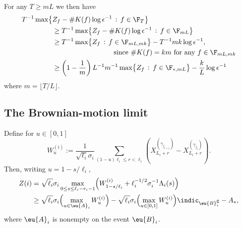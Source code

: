 \documentclass[11pt]{amsart}
\begin{document}
For any $T\ge mL$ we then have
\begin{align*}
	T^{-1}\max\bigl\{ & Z_{f}-\# K(f) \log\epsilon^{-1}\, :\, f\in \F_{T} \bigr\}\\
	& \ge T^{-1}\max\bigl\{ Z_{f}-\# K(f)\log\epsilon^{-1}\, :\, f\in \F_{mL} \bigr\}\\
	&\ge T^{-1}\max\bigl\{ Z_{f}\, :\, f\in \F_{mL, mk} \bigr\} -T^{-1} mk \log\epsilon^{-1}, \\
	&\hspace*{3cm} \text{ since }
	\# K(f)=k m \text{ for any }f\in \F_{mL,mk}\\
	& \ge  \left(1-\frac1m\right) L^{-1} m^{-1} \max\bigl\{ Z_{f}\, :\, f\in \F_{*, mL} \bigr\} -\frac{k}{L} \log\epsilon^{-1}
\end{align*}
where $m=\lfloor T/L\rfloor$.

\subsection{The Brownian-motion limit}
Define for $u\in [0,1]$
$$
W_{u}^{(i)}:= \frac{1}{\sqrt{\ell_i}\sigma_i}  \sum_{(1-u)\ell_i \le r < \ell_i } \left(
X^{(\gamma_{j_{i+1}})}_{L_i + r} - X^{(\gamma_{j_{i}})}_{L_i + r} \right).
$$
Then, writing $u=1-s/\ell_i$,
\begin{align*}
	Z(i) &= \sqrt{\ell_i}\sigma_i \max_{0\le s \le \ell_i-r_i-1} \Bigl( W_{1-s/\ell_i}^{(i)} +  \ell_i^{-1/2} \sigma_i^{-1} \Lambda_i(s) \Bigr)\\
	& \ge \sqrt{\ell_i}\sigma_i \Bigl( \max_{u \in \eu{A}_{i}} W_u^{(i)} \Bigr) -  \sqrt{\ell_i}\sigma_i \Bigl( \max_{u \in [0,1]} W_u^{(i)}  \Bigr) \indic_{\eu{B}^\complement_i} -  A_* ,
\end{align*}
where $\eu{A}_{i}$ is nonempty on the event $\eu{B}_i$.
\end{document}
